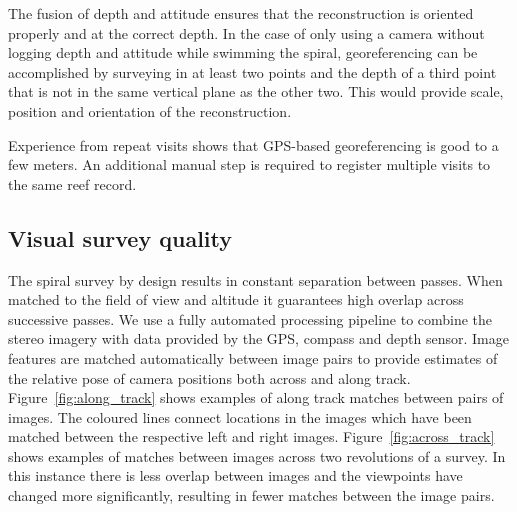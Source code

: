 The fusion of depth and attitude ensures that the reconstruction is oriented properly and at the correct depth. In the case of only using a camera without logging depth and attitude while swimming the spiral, georeferencing can be accomplished by surveying in at least two points and the depth of a third point that is not in the same vertical plane as the other two. This would provide scale, position and orientation of the reconstruction.

Experience from repeat visits shows that GPS-based georeferencing is good to a few meters. An additional manual step is required to register multiple visits to the same reef record.

\subsection{Visual survey quality}
The spiral survey by design results in constant separation between passes. When matched to the field of view and altitude it guarantees high overlap across successive passes. We use a fully automated processing pipeline to combine the stereo imagery with data provided by the GPS, compass and depth sensor.  Image features are matched automatically between image pairs to provide estimates of the relative pose of camera positions both across and along track.  Figure~\ref{fig:along_track} shows examples of along track matches between pairs of images.  The coloured lines connect locations in the images which have been matched between the respective left and right images.  Figure~\ref{fig:across_track} shows examples of matches between images across two revolutions of a survey.  In this instance there is less overlap between images and the viewpoints have changed more significantly, resulting in fewer matches between the image pairs.




    
  
  